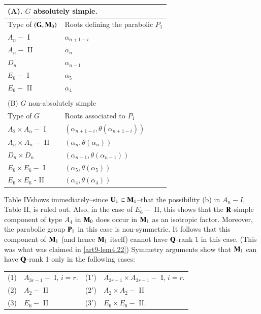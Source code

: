 {
\tabcolsep=3pt
\begin{longtable}{@{}|l|l|@{}}
\caption{}\\
\multicolumn{2}{l}{(A). $G$ absolutely simple.}\\\hline
\multicolumn{1}{|c|}{Type of $(\mathbf{G}, \mathbf{M}_0)$} & \multicolumn{1}{c|}{Roots defining the parabolic $P_1$}\\\hline
\qquad $A_n-$ I & \qquad \qquad $\alpha_{n+1-i}$\\
\qquad $A_n -$ II & \qquad \qquad $\alpha_n$\\
\qquad $D_n$ & \qquad \qquad $\alpha_{n-1}$\\
\qquad $E_6 -$ I & \qquad \qquad $\alpha_5$\\
\qquad $E_6 -$ II & \qquad \qquad $\alpha_4$\\\hline
\multicolumn{2}{l}{} \\[-0.2cm]
\multicolumn{2}{l}{(B) $G$ non-absolutely simple}\\\hline
Type of $G$ & Roots associated to $P_1$\\
\hline
\quad $A_2 \times A_n -$ I & \qquad $(\alpha_{n+1-i},\theta(\alpha_{n+1-i}))$\\
\quad $A_n \times A_n- $ II & \qquad $(\alpha_n, \theta(\alpha_n))$\\
\quad $D_n \times D_n$ & \qquad $(\alpha_{n-1}, \theta(\alpha_{n-1}))$\\
\quad $E_6 \times E_6 -$ I & \qquad $(\alpha_5 , \theta(\alpha_5))$\\
\quad $E_6 \times E_6 $ - II &  \qquad $(\alpha_4, \theta(\alpha_4))$\\\hline
\end{longtable}
}

Table IV\pageoriginale shows immediately--since $\mathbf{U}_1 \subset \mathbf{M}_1$--that the possibility (b) in $A_n - I$, Table II, is ruled out. Also, in the case of $E_6 -$ II, this shows that the $\mathbf{R}$-simple component of type $A_4$ in $\mathbf{M}_0$ does occur in $\mathbf{M}_1$ as an isotropic factor. Moreover, the parabolic group $\mathbf{P}_1$ in this case is non-symmetric. It follows that this component of $\mathbf{M}_1$ (and hence $\mathbf{M}_1$ itself) cannot have $\mathbf{Q}$-rank 1 in this case. (This was what was claimed in \ref{art9-lem4.22}) Symmetry arguments show that $\mathbf{M}_1$ can have $\mathbf{Q}$-rank 1 only in the following cases:
\begin{tabular}{llll}
(1) & $A_{3r-1} -$ I, $i = r$. & (1$'$) & $A_{3r-1} \times A_{3r-1} - $ I, $i = r$. \\
(2) & $A_2 - $ II & (2$'$) & $A_2 \times A_2 -$ II \\
(3) & $E_6 - $ II & (3$'$) & $E_6 \times E_6 -$ II. 
\end{tabular}

